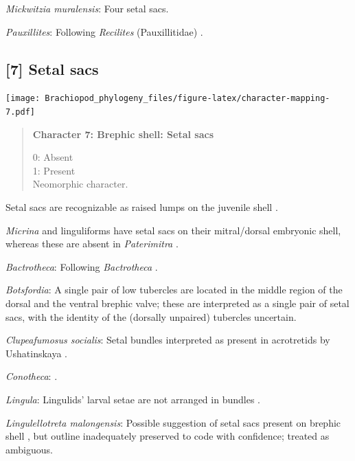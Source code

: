 \documentclass[openany]{book}
\begin{document}
\hypertarget{Mickwitzia_muralensis-coding-6}{}
\emph{Mickwitzia muralensis}: Four setal sacs.

\hypertarget{Pauxillites-coding-6}{}
\emph{Pauxillites}: Following \emph{Recilites} (Pauxillitidae)
\citep{Dzik1978}.

\subsection*{{[}7{]} Setal sacs}\label{setal-sacs}

\texttt{[image: Brachiopod\_phylogeny\_files/figure-latex/character-mapping-7.pdf]}

\begin{quote}
\textbf{Character 7: Brephic shell: Setal sacs}

0: Absent\\
1: Present\\
Neomorphic character.
\end{quote}

Setal sacs are recognizable as raised lumps on the juvenile shell
\citep[see][]{Bassett2017Earliestontogeny}.

\emph{Micrina} and linguliforms have setal sacs on their mitral/dorsal
embryonic shell, whereas these are absent in \emph{Paterimitra}
\citep{Holmer2011Firstrecord}.

\hypertarget{Bactrotheca-coding-7}{}
\emph{Bactrotheca}: Following \emph{Bactrotheca}
\citep{Dzik1980Ontogenyof}.

\hypertarget{Botsfordia-coding-7}{}
\emph{Botsfordia}: A single pair of low tubercles are \citep[ state
``may be'']{Ushatinskaya2016Revisionof} located in the middle region of
the dorsal and the ventral brephic valve; these are interpreted as a
single pair of setal sacs, with the identity of the (dorsally unpaired)
tubercles uncertain.

\hypertarget{Clupeafumosus_socialis-coding-7}{}
\emph{Clupeafumosus socialis}: Setal bundles interpreted as present in
acrotretids by Ushatinskaya \citeyearpar{Ushatinskaya2016Protegulumand}.

\hypertarget{Conotheca-coding-7}{}
\emph{Conotheca}: \citep{Wrona2003}.

\hypertarget{Lingula-coding-7}{}
\emph{Lingula}: Lingulids' larval setae are not arranged in bundles
\citep{Carlson1995Phylogeneticrelationships}.

\hypertarget{Lingulellotreta_malongensis-coding-7}{}
\emph{Lingulellotreta malongensis}: Possible suggestion of setal sacs
present on brephic shell \citep{Holmer1997EarlyCambrian, Li2004}, but
outline inadequately preserved to code with confidence; treated as
ambiguous.
\end{document}
